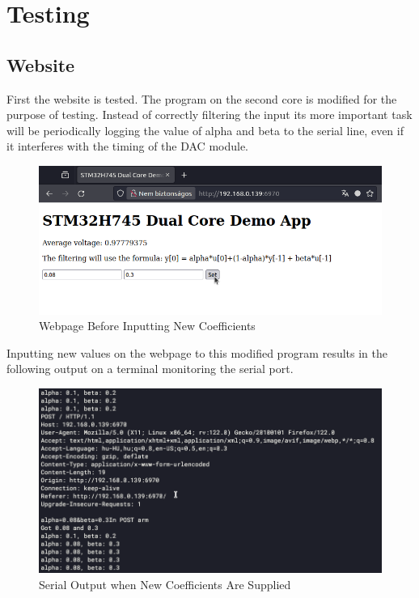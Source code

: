 \chapter{Testing}

\section{Website}

First the website is tested. The program on the second core is modified for the purpose of testing. Instead of correctly filtering the input its more important task will be periodically logging the value of alpha and beta to the serial line, even if it interferes with the timing of the DAC module.

\begin{figure}[H]
    \centering
    \includegraphics[width=150mm, keepaspectratio]{figures/webpage-test1.png}
    \caption{Webpage Before Inputting New Coefficients}
    \label{fig:webpage-test1}
\end{figure}

Inputting new values on the webpage to this modified program results in the following output on a terminal monitoring the serial port.

\begin{figure}[H]
    \centering
    \includegraphics[width=150mm, keepaspectratio]{figures/coef-log.png}
    \caption{Serial Output when New Coefficients Are Supplied}
    \label{fig:coef-log}
\end{figure}

